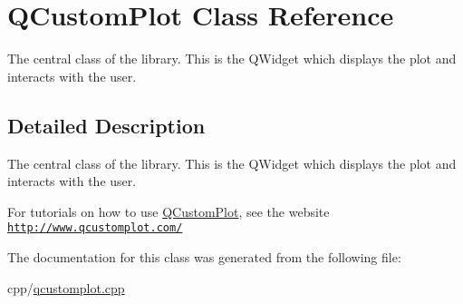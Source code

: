 \hypertarget{class_q_custom_plot}{}\section{Q\+Custom\+Plot Class Reference}
\label{class_q_custom_plot}


The central class of the library. This is the Q\+Widget which displays the plot and interacts with the user.  




\subsection{Detailed Description}
The central class of the library. This is the Q\+Widget which displays the plot and interacts with the user. 

For tutorials on how to use \mbox{\hyperlink{class_q_custom_plot}{Q\+Custom\+Plot}}, see the website~\newline
\href{http://www.qcustomplot.com/}{\tt http\+://www.\+qcustomplot.\+com/} 

The documentation for this class was generated from the following file\+:\begin{DoxyCompactItemize}
\item 
cpp/\mbox{\hyperlink{qcustomplot_8cpp}{qcustomplot.\+cpp}}\end{DoxyCompactItemize}
